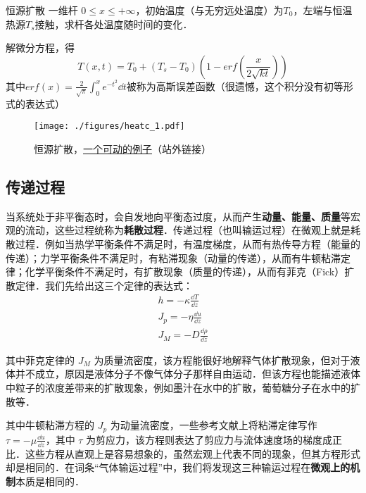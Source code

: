 \begin{example}{恒源扩散}
一维杆 $0\le x\le +\infty$，初始温度（与无穷远处温度）为$T_0$，左端与恒温热源$T_s$接触，求杆各处温度随时间的变化．

解微分方程，得
\begin{equation}
T(x,t)=T_0+(T_s-T_0)\left(1-erf\left(\frac{x}{2\sqrt{kt}}\right)\right)
\end{equation}
其中$erf(x)=\frac{2}{\sqrt{\pi}}\int^x_0 e^{-t^2} \dd t$被称为高斯误差函数（很遗憾，这个积分没有初等形式的表达式）

\begin{figure}[ht]
\centering
\texttt{[image: ./figures/heatc\_1.pdf]}
\caption{恒源扩散，\href{https://www.geogebra.org/m/bd2pb74r}{一个可动的例子}（站外链接）} \label{heatc_fig1}
\end{figure}
\end{example}

\subsection{传递过程}
当系统处于非平衡态时，会自发地向平衡态过度，从而产生\textbf{动量、能量、质量}等宏观的流动，这些过程统称为\textbf{耗散过程}．传递过程（也叫输运过程）在微观上就是耗散过程．例如当热学平衡条件不满足时，有温度梯度，从而有热传导方程（能量的传递）；力学平衡条件不满足时，有粘滞现象（动量的传递），从而有牛顿粘滞定律；化学平衡条件不满足时，有扩散现象（质量的传递），从而有菲克（Fick）扩散定律．我们先给出这三个定律的表达式：
\begin{align}
h=-\kappa \frac{\dd T}{\dd z}\\
J_p=-\eta \frac{\dd u}{\dd z}\\
J_M=-D\frac{\dd \rho}{\dd z}
\end{align}

其中菲克定律的 $J_M$ 为质量流密度，该方程能很好地解释气体扩散现象，但对于液体并不成立，原因是液体分子不像气体分子那样自由运动．但该方程也能描述液体中粒子的浓度差带来的扩散现象，例如墨汁在水中的扩散，葡萄糖分子在水中的扩散等．

其中牛顿粘滞方程的 $J_p$ 为动量流密度，一些参考文献上将粘滞定律写作 $\tau = -\mu \frac{\dd u}{\dd z}$，其中 $\tau$ 为剪应力，该方程则表达了剪应力与流体速度场的梯度成正比．这些方程从直观上是容易想象的，虽然宏观上代表不同的现象，但其方程形式却是相同的．在词条“气体输运过程”中，我们将发现这三种输运过程在\textbf{微观上的机制}本质是相同的．
